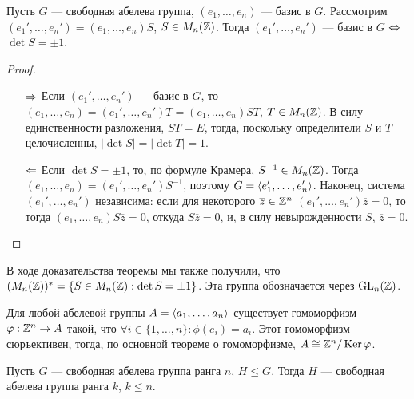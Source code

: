 \begin{theorem}
	Пусть $G$ --- свободная абелева группа, $(e_1, \ldots, e_n)$ --- базис в $G$. Рассмотрим $(e_1', \ldots, e_n') = (e_1, \ldots, e_n)S$, $S \in M_n(\mathbb{Z})$. Тогда $(e_1', \ldots, e_n')$ --- базис в $G$ $\Leftrightarrow$ $\det{S} = \pm1$.
\end{theorem}

\begin{proof}~
	\begin{itemize}
		\item[$\Rightarrow$] Если $(e_1', \ldots, e_n')$ --- базис в $G$, то  $(e_1, \ldots, e_n) = (e_1', \ldots, e_n')T = (e_1, \ldots, e_n)ST$, $T \in M_n(\mathbb{Z})$. В силу единственности разложения, $ST = E$, тогда, поскольку определители $S$ и $T$ целочисленны, $|\det{S}| = |\det{T}| = 1$.
		
		\item[$\Leftarrow$] Если $\det{S} = \pm1$, то, по формуле Крамера, $S^{-1} \in M_n(\mathbb{Z})$. Тогда $(e_1, \ldots, e_n) = (e_1', \ldots, e_n')S^{-1}$, поэтому $G = \langle e_1', \ldots, e_n' \rangle$. Наконец, система $(e_1', \ldots, e_n')$ независима: если для некоторого $\overline{z} \in \mathbb{Z}^n$ $(e_1', \ldots, e_n')\overline{z} = 0$, то тогда $(e_1, \ldots, e_n)S\overline{z} = 0$, откуда $S\overline{z} = \overline{0}$, и, в силу невырожденности $S$, $\overline{z} = \overline{0}$.
	\end{itemize}
\end{proof}

\begin{note}
	В ходе доказательства теоремы мы также получили, что $(M_n(\mathbb{Z}))^* = \{S \in M_n(\mathbb{Z}): \det{S} = \pm1\}$. Эта группа обозначается через $\operatorname{GL}_n(\mathbb{Z})$.
\end{note}

\begin{note}
	Для любой абелевой группы $A = \langle a_1, \ldots, a_n \rangle$ существует гомоморфизм $\varphi: \mathbb{Z}^n \to A$ такой, что $\forall i \in \{1, \ldots, n\}: \phi(e_i) = a_i$. Этот гомоморфизм сюръективен, тогда, по основной теореме о гомоморфизме, $A \cong \mathbb{Z}^n / \operatorname{Ker}\varphi$.
\end{note}

\begin{theorem}
	Пусть $G$ --- свободная абелева группа ранга $n$, $H \le G$. Тогда $H$ --- свободная абелева группа ранга $k$, $k \le n$.
\end{theorem}

